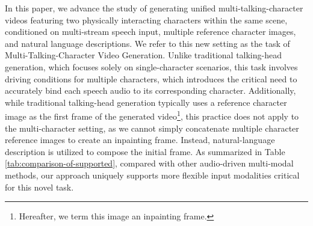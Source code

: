 In this paper, we advance the study of generating unified multi-talking-character videos featuring two physically interacting characters within the same scene, conditioned on multi-stream speech input, multiple reference character images, and natural language descriptions. We refer to this new setting as the task of Multi-Talking-Character Video Generation.
Unlike traditional talking-head generation, which focuses solely on single-character scenarios, this task involves driving conditions for multiple characters, 
which introduces the critical need to accurately bind each speech audio to its corresponding character.
Additionally, while traditional talking-head generation typically uses a reference character image as the first frame of the generated video\footnote{Hereafter, we term this image an inpainting frame.}, this practice does not apply to the multi-character setting, as we cannot simply concatenate multiple character reference images to create an inpainting frame. Instead, natural-language description is utilized to compose the initial frame. As summarized in Table \ref{tab:comparison-of-supported}, compared with other audio-driven multi-modal methods, our approach uniquely supports more flexible input modalities critical for this novel task.

